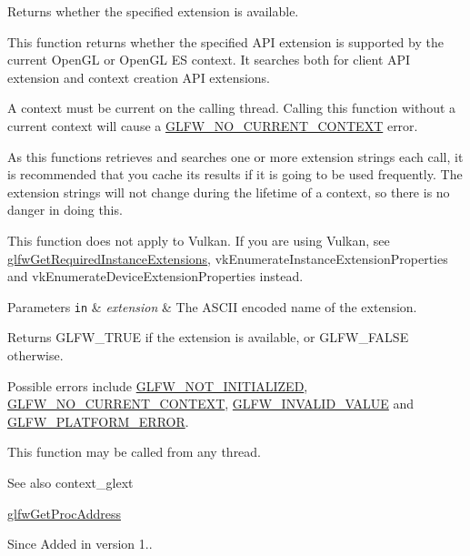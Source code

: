 Returns whether the specified extension is available. 

This function returns whether the specified A\+PI extension is supported by the current Open\+GL or Open\+GL ES context. It searches both for client A\+PI extension and context creation A\+PI extensions.

A context must be current on the calling thread. Calling this function without a current context will cause a \hyperlink{group__errors_gaa8290386e9528ccb9e42a3a4e16fc0d0}{G\+L\+F\+W\+\_\+\+N\+O\+\_\+\+C\+U\+R\+R\+E\+N\+T\+\_\+\+C\+O\+N\+T\+E\+XT} error.

As this functions retrieves and searches one or more extension strings each call, it is recommended that you cache its results if it is going to be used frequently. The extension strings will not change during the lifetime of a context, so there is no danger in doing this.

This function does not apply to Vulkan. If you are using Vulkan, see \hyperlink{group__vulkan_ga70adaf0cfc99adc484c49ea99e17c2cf}{glfw\+Get\+Required\+Instance\+Extensions}, {\ttfamily vk\+Enumerate\+Instance\+Extension\+Properties} and {\ttfamily vk\+Enumerate\+Device\+Extension\+Properties} instead.


\begin{DoxyParams}[1]{Parameters}
\mbox{\tt in}  & {\em extension} & The A\+S\+C\+II encoded name of the extension. \\
\hline
\end{DoxyParams}
\begin{DoxyReturn}{Returns}
{\ttfamily G\+L\+F\+W\+\_\+\+T\+R\+UE} if the extension is available, or {\ttfamily G\+L\+F\+W\+\_\+\+F\+A\+L\+SE} otherwise.
\end{DoxyReturn}
Possible errors include \hyperlink{group__errors_ga2374ee02c177f12e1fa76ff3ed15e14a}{G\+L\+F\+W\+\_\+\+N\+O\+T\+\_\+\+I\+N\+I\+T\+I\+A\+L\+I\+Z\+ED}, \hyperlink{group__errors_gaa8290386e9528ccb9e42a3a4e16fc0d0}{G\+L\+F\+W\+\_\+\+N\+O\+\_\+\+C\+U\+R\+R\+E\+N\+T\+\_\+\+C\+O\+N\+T\+E\+XT}, \hyperlink{group__errors_gaaf2ef9aa8202c2b82ac2d921e554c687}{G\+L\+F\+W\+\_\+\+I\+N\+V\+A\+L\+I\+D\+\_\+\+V\+A\+L\+UE} and \hyperlink{group__errors_gad44162d78100ea5e87cdd38426b8c7a1}{G\+L\+F\+W\+\_\+\+P\+L\+A\+T\+F\+O\+R\+M\+\_\+\+E\+R\+R\+OR}.

This function may be called from any thread.

\begin{DoxySeeAlso}{See also}
context\+\_\+glext 

\hyperlink{group__context_ga0e8af175218929615c16e74938c10f2a}{glfw\+Get\+Proc\+Address}
\end{DoxySeeAlso}
\begin{DoxySince}{Since}
Added in version 1.. 
\end{DoxySince}
\mbox{\label{group__context_gac28d98c655377d81a516bf5ef90780c8}} 
